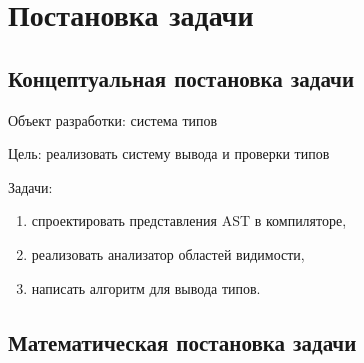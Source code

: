 \chapter{Постановка задачи}
\label{ch:task}


\section{Концептуальная постановка задачи}
\label{sec:abstract_task}

Объект разработки: система типов

Цель: реализовать систему вывода и проверки типов

Задачи:
\begin{enumerate}[1)]
    \item спроектировать представления AST в компиляторе,
    \item реализовать анализатор областей видимости,
    \item написать алгоритм для вывода типов.
\end{enumerate}



\section{Математическая постановка задачи}
\label{sec:math_task}

